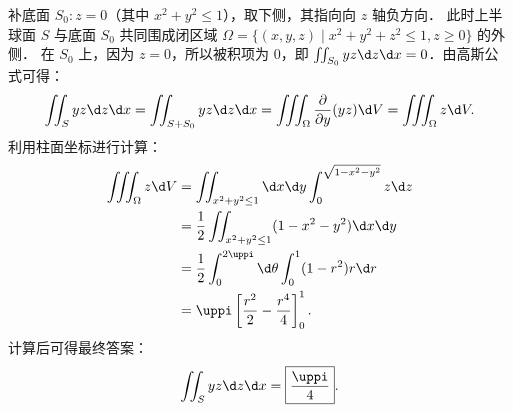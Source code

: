 \begin{solution}
    补底面 $S_0: z = 0$（其中 $x^2 + y^2 \le 1$），取下侧，其指向向 $z$ 轴负方向．
    此时上半球面 $S$ 与底面 $S_0$ 共同围成闭区域 $\Omega = \{ (x, y, z) \mid x^2 + y^2 + z^2 \le 1, z \ge 0 \}$ 的外侧．
    在 $S_0$ 上，因为 $z = 0$，所以被积项为 $0$，即 $\iint_{S_0} y z \d z \d x = 0$．由高斯公式可得：
    \begin{equation}
        \label{eq:hemisphere-top-1}
        \iint_{S} y z \d z \d x = \iint_{S + S_0} y z \d z \d x = \iiint_{\Omega} \frac{\partial}{\partial y} (y z) \d V = \iiint_{\Omega} z \d V.
    \end{equation}
    利用柱面坐标进行计算：
    \begin{equation}
        \label{eq:hemisphere-top-2}
        \begin{aligned}
            \iiint_{\Omega} z \d V & = \iint_{x^2 + y^2 \le 1} \d x \d y \int_0^{\sqrt{1 - x^2 - y^2}} z \d z \\
                                   & = \frac{1}{2} \iint_{x^2 + y^2 \le 1} (1 - x^2 - y^2) \d x \d y          \\
                                   & = \frac{1}{2} \int_0^{2\uppi} \d \theta \int_0^1 (1 - r^2) r \d r        \\
                                   & = \uppi \left[ \frac{r^2}{2} - \frac{r^4}{4} \right]_0^1.
        \end{aligned}
    \end{equation}
    计算后可得最终答案：
    \begin{equation}
        \label{eq:hemisphere-top-3}
        \iint_{S} y z \d z \d x = \boxed{\frac{\uppi}{4}}.
    \end{equation}



\end{solution}
